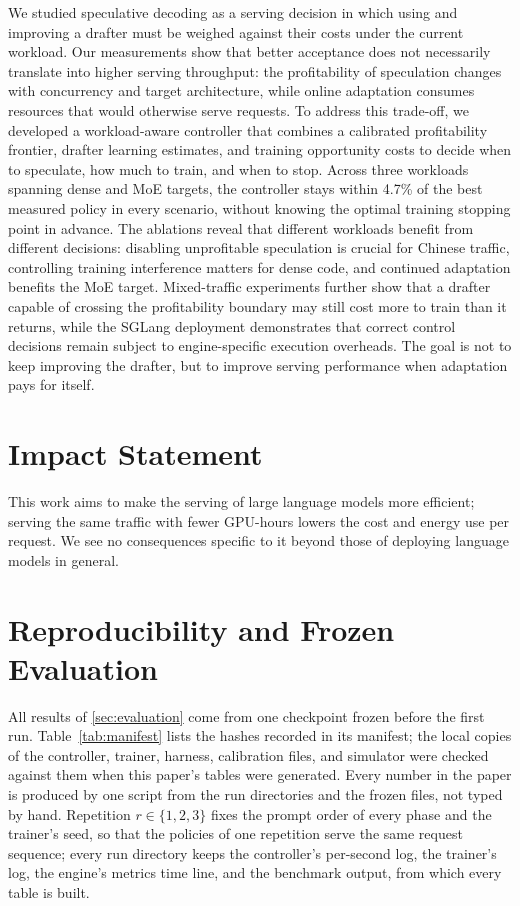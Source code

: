 \documentclass{article}
\begin{document}
We studied speculative decoding as a serving decision in which using and improving a drafter must be weighed against their costs under the current workload. Our measurements show that better acceptance does not necessarily translate into higher serving throughput: the profitability of speculation changes with concurrency and target architecture, while online adaptation consumes resources that would otherwise serve requests. To address this trade-off, we developed a workload-aware controller that combines a calibrated profitability frontier, drafter learning estimates, and training opportunity costs to decide when to speculate, how much to train, and when to stop. Across three workloads spanning dense and MoE targets, the controller stays within 4.7\% of the best measured policy in every scenario, without knowing the optimal training stopping point in advance. The ablations reveal that different workloads benefit from different decisions: disabling unprofitable speculation is crucial for Chinese traffic, controlling training interference matters for dense code, and continued adaptation benefits the MoE target. Mixed-traffic experiments further show that a drafter capable of crossing the profitability boundary may still cost more to train than it returns, while the SGLang deployment demonstrates that correct control decisions remain subject to engine-specific execution overheads. 
The goal is not to keep improving the drafter, but to improve serving performance when adaptation pays for itself.


\section*{Impact Statement}
This work aims to make the serving of large language models more efficient; serving the same traffic with fewer GPU-hours lowers the cost and energy use per request. We see no consequences specific to it beyond those of deploying language models in general.




\newpage
\appendix
\onecolumn
\FloatBarrier
\section{Reproducibility and Frozen Evaluation}\label{app:manifest}

All results of \cref{sec:evaluation} come from one checkpoint frozen before the first run. Table~\ref{tab:manifest} lists the hashes recorded in its manifest; the local copies of the controller, trainer, harness, calibration files, and simulator were checked against them when this paper's tables were generated. Every number in the paper is produced by one script from the run directories and the frozen files, not typed by hand. Repetition $r\in\{1,2,3\}$ fixes the prompt order of every phase and the trainer's seed, so that the policies of one repetition serve the same request sequence; every run directory keeps the controller's per-second log, the trainer's log, the engine's metrics time line, and the benchmark output, from which every table is built.
\end{document}
